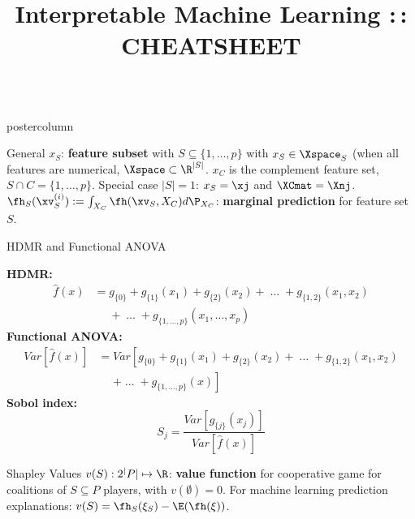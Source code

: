 \documentclass{beamer}
\title{Interpretable Machine Learning :\,: CHEATSHEET} %
\newlength{\columnheight} %
\begin{document}
\begin{frame}[fragile]{}
\vspace{-8ex}
\begin{columns}
	\begin{column}{.31\textwidth}
		\begin{beamercolorbox}[center]{postercolumn}
			\begin{minipage}{.98\textwidth}
				\parbox[t][\columnheight]{\textwidth}{
\begin{myblock}{General} \vspace{-2ex}
  $x_S$: \textbf{feature subset} with $S \subseteq \{1, \ldots, p\}$  with $x_S \in \Xspace_S$ (when all features are numerical, $\Xspace \subset \R^{|S|}$. $x_C$ is the complement feature set, $S \cap C = \{1, \ldots, p\}$. Special case $|S| = 1$: $x_S= \xj$ and $\XCmat = \Xnj$. \\

  $\fh_{S}(\xv_S^{(i)}) := \int_{X_C} \fh(\xv_S, X_C)d \P_{X_C}$: \textbf{marginal prediction} for feature set $S$. \\
\end{myblock}

\begin{myblock}{HDMR and Functional ANOVA} 

\textbf{HDMR:}
\begin{align*}
\hat{f}(x) &= g_{\{0\}} + g_{\{1\}}(x_1) + g_{\{2\}}(x_2) + \;\dots\; + g_{\{1, 2\}}(x_1, x_2) \\
&\phantom{{}={}} + \;\dots\; + g_{\{1,\ldots,p\}}(x_1, \ldots,x_p)
\end{align*}
\textbf{Functional ANOVA:}
\begin{align*}
Var\left[\hat{f}(x)\right] &= Var\left[g_{\{0\}} + g_{\{1\}}(x_1) + g_{\{2\}}(x_2) + \;\dots\; + g_{\{1, 2\}}(x_1, x_2) \right. \\
&\phantom{{}={}} \left. + \;\dots\; + g_{\{1,\ldots,p\}}(x) \right]
\end{align*}
\textbf{Sobol index:}
$$
S_j = \frac{Var\left[g_{\{j\}}(x_j)\right]}{Var\left[\hat{f}(x)\right]}
$$
\end{myblock}
\begin{myblock}{Shapley Values} 
  $v(S): 2^|P| \mapsto \R$: \textbf{value function} for cooperative game for coalitions of $S \subseteq P$ players, with $v(\emptyset) = 0$. For machine learning prediction explanations: $v(S) =  \fh_{S} (\xi_S) - \E (\fh(\xi))$. \\


\end{myblock}}
\end{minipage}
\end{beamercolorbox}
\end{column}
\end{columns}
\end{frame}
\end{document}
